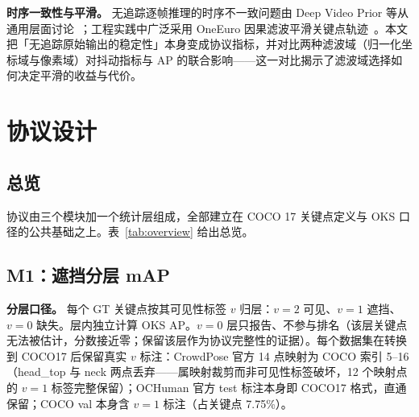 \documentclass[10pt,conference]{IEEEtran}
\begin{document}
\textbf{时序一致性与平滑。} 无追踪逐帧推理的时序不一致问题由 Deep Video Prior 等从通用层面讨论~\cite{12}；工程实践中广泛采用 OneEuro 因果滤波平滑关键点轨迹~\cite{13}。本文把「无追踪原始输出的稳定性」本身变成协议指标，并对比两种滤波域（归一化坐标域与像素域）对抖动指标与 AP 的联合影响——这一对比揭示了滤波域选择如何决定平滑的收益与代价。

\section{协议设计}

\subsection{总览}

协议由三个模块加一个统计层组成，全部建立在 COCO 17 关键点定义与 OKS 口径的公共基础之上。表~\ref{tab:overview} 给出总览。

\begin{table}[t]
\centering
\caption{协议总览。}
\label{tab:overview}
\renewcommand{\arraystretch}{1.15}
\end{table}

\subsection{M1：遮挡分层 mAP}

\textbf{分层口径。} 每个 GT 关键点按其可见性标签 $v$ 归层：$v{=}2$ 可见、$v{=}1$ 遮挡、$v{=}0$ 缺失。层内独立计算 OKS AP。$v{=}0$ 层只报告、不参与排名（该层关键点无法被估计，分数接近零；保留该层作为协议完整性的证据）。每个数据集在转换到 COCO17 后保留真实 $v$ 标注：CrowdPose 官方 14 点映射为 COCO 索引 5--16（head\_top 与 neck 两点丢弃——属映射裁剪而非可见性标签破坏，12 个映射点的 $v{=}1$ 标签完整保留）；OCHuman 官方 test 标注本身即 COCO17 格式，直通保留；COCO val 本身含 $v{=}1$ 标注（占关键点 7.75\%）。
\end{document}
